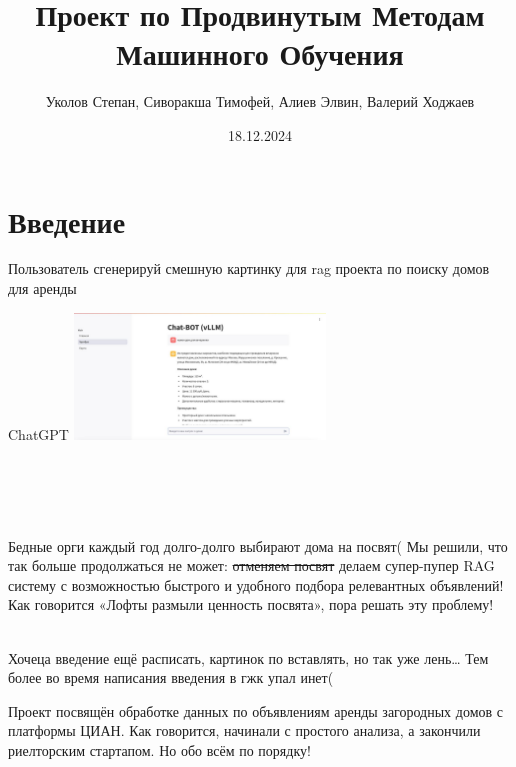 \documentclass{article}
\begin{document}
\title{Проект по Продвинутым Методам Машинного Обучения}
\author{Уколов Степан, Сиворакша Тимофей, Алиев Элвин, Валерий Ходжаев}
\date{18.12.2024}
\maketitle

\newpage
\tableofcontents

\newpage

\section{Введение}


\begin{mychatbox}[colback=red!5!white]{Пользователь}
сгенерируй смешную картинку для rag проекта по поиску домов для аренды
\end{mychatbox}

\vspace{1em}

\begin{mychatbox}[colback=green!5!white]{ChatGPT}
\includegraphics[width=0.5\textwidth]{1.jpg}
\end{mychatbox}

\\
\\
\\
\\

Бедные орги каждый год долго-долго выбирают дома на посвят( Мы решили, что так больше продолжаться не может: \sout{отменяем посвят} делаем супер-пупер RAG систему с возможностью быстрого и удобного подбора релевантных объявлений! Как говорится «Лофты размыли ценность посвята», пора решать эту проблему! 

\\

Хочеца введение ещё расписать, картинок по вставлять, но так уже лень… Тем более во время написания введения в гжк упал инет(


Проект посвящён обработке данных по объявлениям аренды загородных домов с платформы ЦИАН. Как говорится, начинали с простого анализа, а закончили риелторским стартапом. Но обо всём по порядку!
\end{document}
